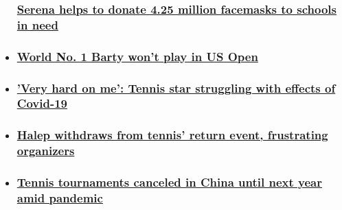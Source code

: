 \begin{itemize}
{  \subsubsection{\texorpdfstring{\href{/2020/07/31/tennis/serena-williams-facemasks-schools-spt-intl/index.html}{Serena
  helps to donate 4.25 million facemasks to schools in need
  }}{Serena helps to donate 4.25 million facemasks to schools in need }}\label{serena-helps-to-donate-425-million-facemasks-to-schools-in-need-}}
\item
  \hypertarget{world-no-1-barty-wont-play-in-us-open}{%
  \subsubsection{\texorpdfstring{\href{/2020/07/29/tennis/ashleigh-barty-wont-play-in-us-open-spt-intl/index.html}{World
  No. 1 Barty won't play in US
  Open}}{World No. 1 Barty won't play in US Open}}\label{world-no-1-barty-wont-play-in-us-open}}
\item
  \hypertarget{very-hard-on-me-tennis-star-struggling-with-effects-of-covid-19}{%
  \subsubsection{\texorpdfstring{\href{/2020/07/28/tennis/grigor-dimitrov-coronavirus-tennis-spt-intl/index.html}{'Very
  hard on me': Tennis star struggling with effects of
  Covid-19}}{'Very hard on me': Tennis star struggling with effects of Covid-19}}\label{very-hard-on-me-tennis-star-struggling-with-effects-of-covid-19}}
\item
  \hypertarget{halep-withdraws-from-tennis-return-event-frustrating-organizers-}{%
  \subsubsection{\texorpdfstring{\href{/2020/07/26/tennis/halep-tennis-withdrawal-palermo-spt-intl/index.html}{Halep
  withdraws from tennis' return event, frustrating organizers
  }}{Halep withdraws from tennis' return event, frustrating organizers }}\label{halep-withdraws-from-tennis-return-event-frustrating-organizers-}}
\item
  \hypertarget{tennis-tournaments-canceled-in-china-until-next-year-amid-pandemic-}{%
  \subsubsection{\texorpdfstring{\href{/2020/07/24/tennis/atp-wta-china-pandemic-coronavirus-spt-intl/index.html}{Tennis
  tournaments canceled in China until next year amid pandemic
  }}{Tennis tournaments canceled in China until next year amid pandemic }}\label{tennis-tournaments-canceled-in-china-until-next-year-amid-pandemic-}}
\end{itemize}

